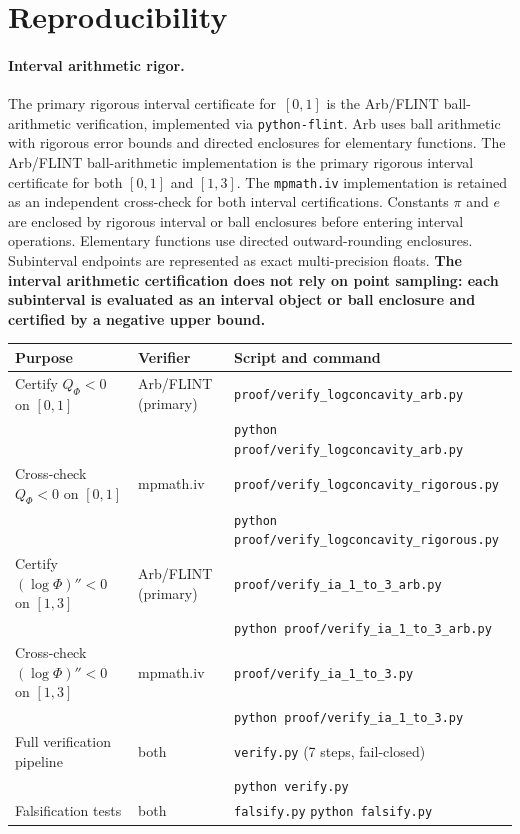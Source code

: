 \documentclass[11pt]{article}
\theoremstyle{definition}
\theoremstyle{remark}
\begin{document}
\section{Reproducibility}
\label{sec:reproduce}

\paragraph{Interval arithmetic rigor.}
The primary rigorous interval certificate for~$[0,1]$ is the Arb/FLINT
ball-arithmetic verification, implemented via \texttt{python-flint}.
Arb uses ball arithmetic with rigorous error bounds and directed enclosures for
elementary functions.
The Arb/FLINT ball-arithmetic implementation is the primary rigorous interval
certificate for both $[0,1]$ and $[1,3]$.
The \texttt{mpmath.iv} implementation is retained as an independent cross-check
for both interval certifications.
Constants $\pi$ and $e$ are enclosed by rigorous interval or ball enclosures
before entering interval operations.
Elementary functions use directed outward-rounding enclosures.
Subinterval endpoints are represented as exact multi-precision floats.
\textbf{The interval arithmetic certification does not rely on point sampling:
each subinterval is evaluated as an interval object or ball enclosure and
certified by a negative upper bound.}

\begin{center}\footnotesize
\begin{tabular}{@{}p{3.5cm}p{1.6cm}p{4.5cm}@{}}
\toprule
Purpose & Verifier & Script and command \\
\midrule
Certify $Q_\Phi<0$ on $[0,1]$ &
  Arb/FLINT (primary) &
  \texttt{proof/verify\_logconcavity\_arb.py} \\
  & & \texttt{python proof/verify\_logconcavity\_arb.py} \\[3pt]
Cross-check $Q_\Phi<0$ on $[0,1]$ &
  mpmath.iv &
  \texttt{proof/verify\_logconcavity\_rigorous.py} \\
  & & \texttt{python proof/verify\_logconcavity\_rigorous.py} \\[3pt]
Certify $(\log\Phi)''<0$ on $[1,3]$ &
  Arb/FLINT (primary) &
  \texttt{proof/verify\_ia\_1\_to\_3\_arb.py} \\
  & & \texttt{python proof/verify\_ia\_1\_to\_3\_arb.py} \\[3pt]
Cross-check $(\log\Phi)''<0$ on $[1,3]$ &
  mpmath.iv &
  \texttt{proof/verify\_ia\_1\_to\_3.py} \\
  & & \texttt{python proof/verify\_ia\_1\_to\_3.py} \\[3pt]
Full verification pipeline &
  both &
  \texttt{verify.py} (7 steps, fail-closed) \\
  & & \texttt{python verify.py} \\[3pt]
Falsification tests &
  both &
  \texttt{falsify.py} \quad \texttt{python falsify.py} \\
\bottomrule
\end{tabular}
\end{center}
\end{document}
